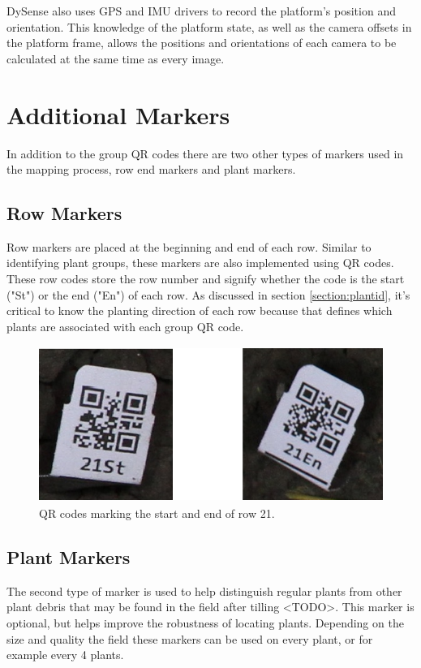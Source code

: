DySense also uses GPS and IMU drivers to record the platform's position and orientation.  This knowledge of the platform state, as well as the camera offsets in the platform frame, allows the positions and orientations of each camera to be calculated at the same time as every image.    

\section{Additional Markers}
\label{system-markers}

In addition to the group QR codes there are two other types of markers used in the mapping process, row end markers and plant markers.   

\subsection{Row Markers}

Row markers are placed at the beginning and end of each row. Similar to identifying plant groups, these markers are also implemented using QR codes.  These row codes store the row number and signify whether the code is the start ("St") or the end ("En") of each row. As discussed in section \ref{section:plantid}, it's critical to know the planting direction of each row because that defines which plants are associated with each group QR code.

\begin{figure}[htb]
	\centering
    \includegraphics[height=2in]{figures/row_codes.png}
    \caption[Row QR codes]{QR codes marking the start and end of row 21.}
    \label{figure:row_codes}
\end{figure}

\subsection{Plant Markers}

The second type of marker is used to help distinguish regular plants from other plant debris that may be found in the field after tilling <TODO>.  This marker is optional, but helps improve the robustness of locating plants.  Depending on the size and quality the field these markers can be used on every plant, or for example every 4 plants. 

